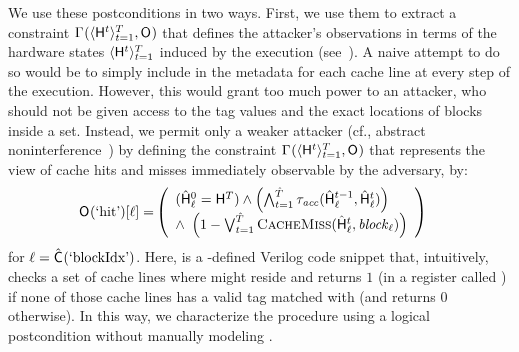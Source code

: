 We use these postconditions in two ways.  First, we use them to
extract a constraint
$\Gamma_{}^{}(\langle\mathsf{H}_{}^{t}\rangle_{t=1}^{T},
\mathsf{O}_{})$ that defines the attacker's observations \AOOFn{} in terms
of the hardware states
$\langle\mathsf{H}_{}^{t}\rangle_{t=1}^{T}$ induced by the
execution (see~). A naive attempt to
do so would be to simply include in \AOOFn{} the metadata for each
cache line at every step of the execution.  However, this would grant
too much power to an attacker, who should not be given access to the
tag values and the exact locations of blocks inside a set.  Instead,
we permit only a weaker attacker (cf., abstract
noninterference~\cite{giacobazzi2004abstract}) by defining the
constraint
$\Gamma_{}^{}(\langle\mathsf{H}_{}^{t}\rangle_{t=1}^{T},\mathsf{O}_{})$
that represents the view of cache hits and misses immediately
observable by the adversary, by:
\begin{align*}
  \AOOFn{}(\hitVar)[\blockIdx] = &
  \left(\begin{array}{ll}
    (\HwFnAccess{\blockIdx}{0} = \HwFn{}{\ncycles}) \wedge \left(\bigwedge_{\cycle
  = 1}^{\ncyclesAccess}
\TmpTransConstraints{\accessProc}(\HwFnAccess{\blockIdx}{\cycle-1},
\HwFnAccess{\blockIdx}{\cycle})\right) \\
\wedge~\hfill\left(1 - \bigvee_{\cycle = 1}^{\ncyclesAccess}
\cachemiss(\HwFnAccess{\blockIdx}{\cycle}, \block{\blockIdx})\right)
\end{array}\right)
\end{align*}
for $\ell = \hat{\mathsf{C}}_{}(\textrm{`blockIdx'})$.  Here, \cachemiss is a
\boom-defined Verilog code snippet that, intuitively, checks a set of
cache lines where \block{\blockIdx} might reside and returns $1$ (in a
register called \hitRegisterVar) if none of those cache lines has a
valid tag matched with \block{\blockIdx} (and returns $0$ otherwise).
In this way, we characterize the procedure \accessProc using a logical
postcondition without manually modeling \cachemiss.

